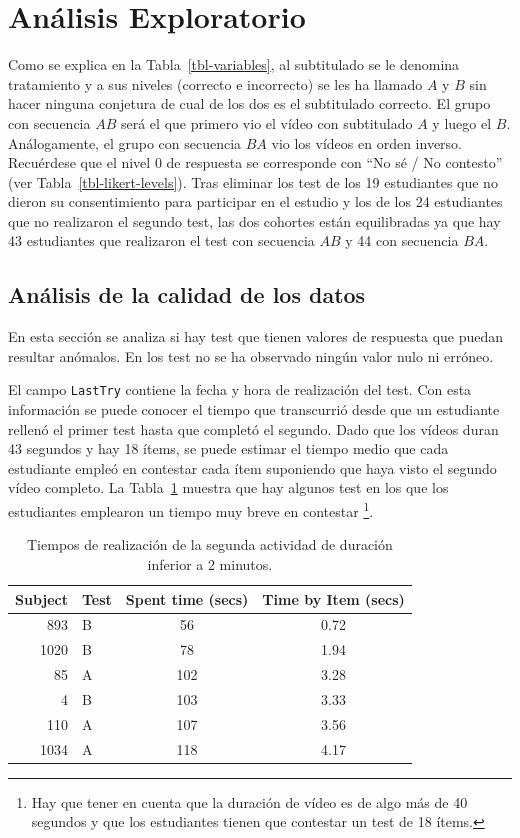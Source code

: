 \documentclass[
  12pt,
  a4paper,
  extrafontsizes,
  onecolumn,
  openright,
  table]{memoir}
\begin{document}
\hypertarget{sec-eda}{%
\section{Análisis Exploratorio}\label{sec-eda}}

Como se explica en la Tabla~\ref{tbl-variables}, al subtitulado se le
denomina tratamiento y a sus niveles (correcto e incorrecto) se les ha
llamado \(A\) y \(B\) sin hacer ninguna conjetura de cual de los dos es
el subtitulado correcto. El grupo con secuencia \(AB\) será el que
primero vio el vídeo con subtitulado \(A\) y luego el \(B\).
Análogamente, el grupo con secuencia \(BA\) vio los vídeos en orden
inverso. Recuérdese que el nivel 0 de respuesta se corresponde con
\enquote{No sé / No contesto} (ver Tabla~\ref{tbl-likert-levels}). Tras
eliminar los test de los 19 estudiantes que no dieron su consentimiento
para participar en el estudio y los de los 24 estudiantes que no
realizaron el segundo test, las dos cohortes están equilibradas ya que
hay 43 estudiantes que realizaron el test con secuencia \(AB\) y 44 con
secuencia \(BA\).

\hypertarget{anuxe1lisis-de-la-calidad-de-los-datos}{%
\subsection{Análisis de la calidad de los
datos}\label{anuxe1lisis-de-la-calidad-de-los-datos}}

En esta sección se analiza si hay test que tienen valores de respuesta
que puedan resultar anómalos. En los test no se ha observado ningún
valor nulo ni erróneo.

El campo \texttt{LastTry} contiene la fecha y hora de realización del
test. Con esta información se puede conocer el tiempo que transcurrió
desde que un estudiante rellenó el primer test hasta que completó el
segundo. Dado que los vídeos duran 43 segundos y hay 18 ítems, se puede
estimar el tiempo medio que cada estudiante empleó en contestar cada
ítem suponiendo que haya visto el segundo vídeo completo. La
Tabla~\ref{tbl-washout} muestra que hay algunos test en los que los
estudiantes emplearon un tiempo muy breve en contestar \footnote{Hay que
  tener en cuenta que la duración de vídeo es de algo más de 40 segundos
  y que los estudiantes tienen que contestar un test de 18 ítems.}.

\hypertarget{tbl-washout}{}
\begin{longtable}{rlcc}
\caption{\label{tbl-washout}Tiempos de realización de la segunda actividad de duración inferior a 2
minutos. }\tabularnewline

\toprule
Subject & Test & Spent time (secs) & Time by Item (secs) \\ 
\midrule
893 & B & 56 & 0.72 \\ 
1020 & B & 78 & 1.94 \\ 
85 & A & 102 & 3.28 \\ 
4 & B & 103 & 3.33 \\ 
110 & A & 107 & 3.56 \\ 
1034 & A & 118 & 4.17 \\ 
\bottomrule
\end{longtable}
\end{document}
